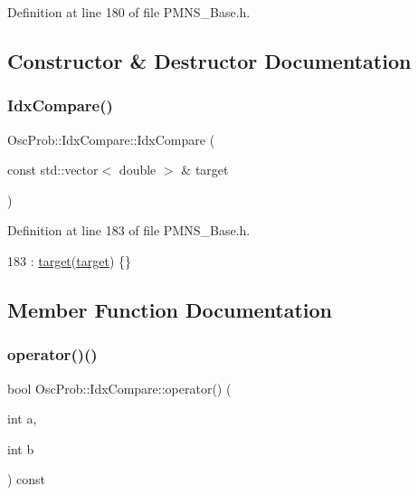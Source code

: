 Definition at line 180 of file P\+M\+N\+S\+\_\+\+Base.\+h.



\subsection{Constructor \& Destructor Documentation}
\mbox{\label{structOscProb_1_1IdxCompare_af1c43639da52d0c66e587c7432582cb5}} 
\subsubsection{\texorpdfstring{Idx\+Compare()}{IdxCompare()}}
{\footnotesize\ttfamily Osc\+Prob\+::\+Idx\+Compare\+::\+Idx\+Compare (\begin{DoxyParamCaption}\item[{const std\+::vector$<$ double $>$ \&}]{target }\end{DoxyParamCaption})\hspace{0.3cm}{\ttfamily [inline]}}



Definition at line 183 of file P\+M\+N\+S\+\_\+\+Base.\+h.


\begin{DoxyCode}
183 : \hyperlink{structOscProb_1_1IdxCompare_ab3258085f0afeb64bf472413bfed43ac}{target}(\hyperlink{structOscProb_1_1IdxCompare_ab3258085f0afeb64bf472413bfed43ac}{target}) \{\}
\end{DoxyCode}


\subsection{Member Function Documentation}
\mbox{\label{structOscProb_1_1IdxCompare_ac4c6fc547109b3e0007d6342eea57dff}} 
\subsubsection{\texorpdfstring{operator()()}{operator()()}}
{\footnotesize\ttfamily bool Osc\+Prob\+::\+Idx\+Compare\+::operator() (\begin{DoxyParamCaption}\item[{int}]{a,  }\item[{int}]{b }\end{DoxyParamCaption}) const\hspace{0.3cm}{\ttfamily [inline]}}



